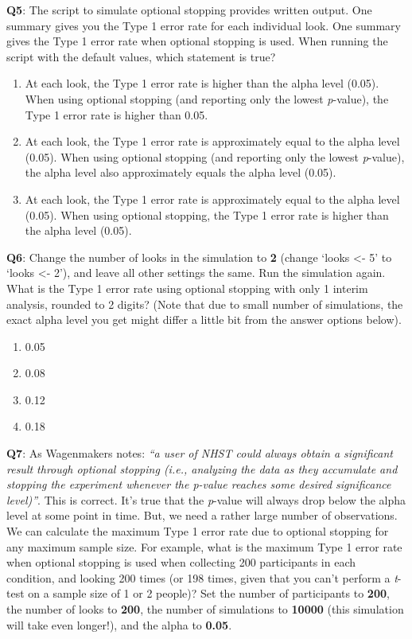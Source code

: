 \documentclass[
  oneside]{krantz}
\providecommand{\tightlist}{%
  \setlength{\itemsep}{0pt}\setlength{\parskip}{0pt}}
\begin{document}
\textbf{Q5}: The script to simulate optional stopping provides written output. One summary gives you the Type 1 error rate for each individual look. One summary gives the Type 1 error rate when optional stopping is used. When running the script with the default values, which statement is true?

\begin{enumerate}
\def\labelenumi{\Alph{enumi})}
\tightlist
\item
  At each look, the Type 1 error rate is higher than the alpha level (0.05).
  When using optional stopping (and reporting only the lowest \emph{p}-value), the Type 1 error rate is higher than 0.05.
\item
  At each look, the Type 1 error rate is approximately equal to the alpha level (0.05). When using optional stopping (and reporting only the lowest \emph{p}-value), the alpha level also approximately equals the alpha level (0.05).
\item
  At each look, the Type 1 error rate is approximately equal to the alpha level (0.05). When using optional stopping, the Type 1 error rate is higher than the alpha level (0.05).
\end{enumerate}

\textbf{Q6}: Change the number of looks in the simulation to \textbf{2} (change `looks \textless- 5' to `looks \textless- 2'), and leave all other settings the same. Run the simulation again. What is the Type 1 error rate using optional stopping with only 1 interim analysis, rounded to 2 digits? (Note that due to small number of simulations, the exact alpha level you get might differ a little bit from the
answer options below).

\begin{enumerate}
\def\labelenumi{\Alph{enumi})}
\tightlist
\item
  0.05
\item
  0.08
\item
  0.12
\item
  0.18
\end{enumerate}

\textbf{Q7}: As Wagenmakers \citeyearpar{wagenmakers_practical_2007} notes: \emph{``a user of NHST could always obtain a significant result through optional stopping (i.e., analyzing the data as they accumulate and stopping the experiment whenever the p-value reaches some desired significance level)''}. This is correct. It's true that the \emph{p}-value will always drop below the alpha level at some point in time. But, we need a rather large number of observations. We can calculate the maximum Type 1 error rate due to optional stopping for any maximum sample size. For example, what is the maximum Type 1 error rate when optional stopping is used when collecting 200 participants in each condition, and looking 200 times (or 198 times, given that you can't perform a \emph{t}-test on a sample size of 1 or 2 people)? Set the number of participants to \textbf{200}, the number of looks to \textbf{200}, the number of simulations to \textbf{10000} (this simulation will take even longer!), and the alpha to \textbf{0.05}.
\end{document}
